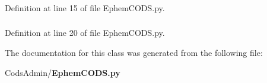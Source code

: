 \subsubsection[{nombre\-\_\-arch}]{}\label{class_cods_admin_1_1_ephem_c_o_d_s_1_1_ephem_c_o_d_s_ae01bd8c891aa0b84ba03c7100abd87d1}


\-Definition at line 15 of file \-Ephem\-C\-O\-D\-S.\-py.

\subsubsection[{seg}]{}\label{class_cods_admin_1_1_ephem_c_o_d_s_1_1_ephem_c_o_d_s_a7e4a03710ca594e5f3aa864012f8af86}


\-Definition at line 20 of file \-Ephem\-C\-O\-D\-S.\-py.



\-The documentation for this class was generated from the following file\-:\begin{DoxyCompactItemize}
\item 
\-Cods\-Admin/{\bf \-Ephem\-C\-O\-D\-S.\-py}\end{DoxyCompactItemize}
